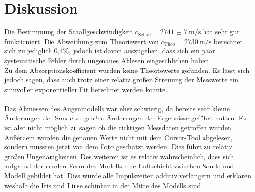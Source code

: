\section{Diskussion}

    Die Bestimmung der Schallgeschwindigkeit $c_{\text{Schall}} = \SI{2741(7)}{\metre\per\second}$ hat sehr gut funktioniert. Die Abweichung zum 
    Theoriewert von $c_{\text{Theo}} = \SI{2730}{\metre\per\second}$ \cite{cA} berechnet sich zu jediglich 0,4\%, jedoch ist davon auszugehen, 
    dass sich ein paar systematische Fehler durch ungenaues Ablesen eingeschlichen haben.\\
    Zu dem Absorptionskoeffizient wurden keine Theoriewerte gefunden. Es lässt sich jedoch sagen, dass auch trotz einer relativ großen Streuung 
    der Messwerte ein sinnvoller exponentieller Fit berechnet werden konnte.\\\\
    \noindent
    Das Abmessen des Augenmodells war eher schwierig, da bereits sehr kleine Änderungen der Sonde zu großen Änderungen der Ergebnisse geführt 
    hatten. Es ist also nicht möglich zu sagen ob die richtigen Messdaten getroffen wurden. Außerdem wurden die genauen Werte nicht mit dem 
    Cursor-Tool abgelesen, sondern mussten jetzt von dem Foto geschätzt werden. Dies führt zu relativ großen Ungenauigkeiten.
    Des weiteren ist es relativ wahrscheinlich, dass sich aufgrund der runden Form des Modells eine Luftschicht zwischen Sonde und Modell 
    gebildet hat. Dies würde alle Impulszeiten additiv verlängern und erklären weshalb die Iris und Linse schinbar in der Mitte des Modells sind.
    
